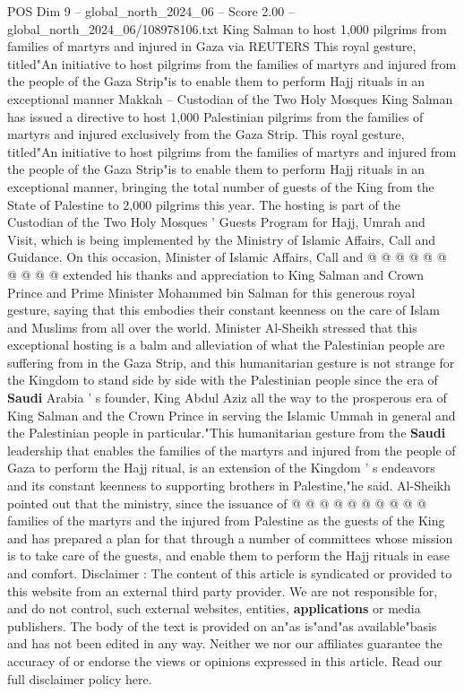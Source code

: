 \begin{textsample}{POS Dim 9 – global\_north\_2024\_06 – Score 2.00 – global\_north\_2024\_06/108978106.txt}  \label{ex:f9_pos_278}
King Salman to host 1,000 pilgrims from families of martyrs and injured in Gaza via REUTERS This royal gesture, titled"An initiative to host pilgrims from the families of martyrs and injured from the people of the Gaza Strip"is to enable them to perform Hajj rituals in an exceptional manner Makkah -- Custodian of the Two Holy Mosques King Salman has issued a directive to host 1,000 Palestinian pilgrims from the families of martyrs and injured exclusively from the Gaza Strip.
This royal gesture, titled"An initiative to host pilgrims from the families of martyrs and injured from the people of the Gaza Strip"is to enable them to perform Hajj rituals in an exceptional manner, bringing the total number of guests of the King from the State of Palestine to 2,000 pilgrims this year.
The hosting is part of the Custodian of the Two Holy Mosques ' Guests Program for Hajj, Umrah and Visit, which is being implemented by the Ministry of Islamic Affairs, Call and Guidance.
On this occasion, Minister of Islamic Affairs, Call and @ @ @ @ @ @ @ @ @ @ extended his thanks and appreciation to King Salman and Crown Prince and Prime Minister Mohammed bin Salman for this generous royal gesture, saying that this embodies their constant keenness on the care of Islam and Muslims from all over the world.
Minister Al-Sheikh stressed that this exceptional hosting is a balm and alleviation of what the Palestinian people are suffering from in the Gaza Strip, and this humanitarian gesture is not strange for the Kingdom to stand side by side with the Palestinian people since the era of \textbf{Saudi} Arabia ' s founder, King Abdul Aziz all the way to the prosperous era of King Salman and the Crown Prince in serving the Islamic Ummah in general and the Palestinian people in particular."This humanitarian gesture from the \textbf{Saudi} leadership that enables the families of the martyrs and injured from the people of Gaza to perform the Hajj ritual, is an extension of the Kingdom ' s endeavors and its constant keenness to supporting brothers in Palestine,"he said.
Al-Sheikh pointed out that the ministry, since the issuance of @ @ @ @ @ @ @ @ @ @ families of the martyrs and the injured from Palestine as the guests of the King and has prepared a plan for that through a number of committees whose mission is to take care of the guests, and enable them to perform the Hajj rituals in ease and comfort.
Disclaimer : The content of this article is syndicated or provided to this website from an external third party provider.
We are not responsible for, and do not control, such external websites, entities, \textbf{applications} or media publishers.
The body of the text is provided on an"as is"and"as available"basis and has not been edited in any way.
Neither we nor our affiliates guarantee the accuracy of or endorse the views or opinions expressed in this article.
Read our full disclaimer policy here.

\end{textsample}
